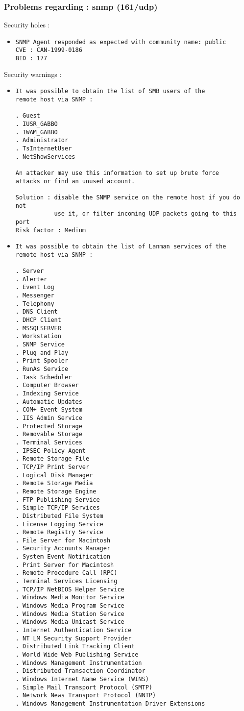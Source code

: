 \documentclass{article}
\begin{document}
\subsubsection{Problems regarding : snmp (161/udp)}
Security holes :\\
\begin{itemize}
\item \begin{verbatim}
SNMP Agent responded as expected with community name: public
CVE : CAN-1999-0186
BID : 177
\end{verbatim}\end{itemize}
Security warnings :\\
\begin{itemize}
\item \begin{verbatim}
It was possible to obtain the list of SMB users of the
remote host via SNMP : 

. Guest
. IUSR_GABBO
. IWAM_GABBO
. Administrator
. TsInternetUser
. NetShowServices

An attacker may use this information to set up brute force
attacks or find an unused account.

Solution : disable the SNMP service on the remote host if you do not
           use it, or filter incoming UDP packets going to this port
Risk factor : Medium
\end{verbatim}\item \begin{verbatim}
It was possible to obtain the list of Lanman services of the
remote host via SNMP : 

. Server
. Alerter
. Event Log
. Messenger
. Telephony
. DNS Client
. DHCP Client
. MSSQLSERVER
. Workstation
. SNMP Service
. Plug and Play
. Print Spooler
. RunAs Service
. Task Scheduler
. Computer Browser
. Indexing Service
. Automatic Updates
. COM+ Event System
. IIS Admin Service
. Protected Storage
. Removable Storage
. Terminal Services
. IPSEC Policy Agent
. Remote Storage File
. TCP/IP Print Server
. Logical Disk Manager
. Remote Storage Media
. Remote Storage Engine
. FTP Publishing Service
. Simple TCP/IP Services
. Distributed File System
. License Logging Service
. Remote Registry Service
. File Server for Macintosh
. Security Accounts Manager
. System Event Notification
. Print Server for Macintosh
. Remote Procedure Call (RPC)
. Terminal Services Licensing
. TCP/IP NetBIOS Helper Service
. Windows Media Monitor Service
. Windows Media Program Service
. Windows Media Station Service
. Windows Media Unicast Service
. Internet Authentication Service
. NT LM Security Support Provider
. Distributed Link Tracking Client
. World Wide Web Publishing Service
. Windows Management Instrumentation
. Distributed Transaction Coordinator
. Windows Internet Name Service (WINS)
. Simple Mail Transport Protocol (SMTP)
. Network News Transport Protocol (NNTP)
. Windows Management Instrumentation Driver Extensions


\end{verbatim}
\end{itemize}
\end{document}
